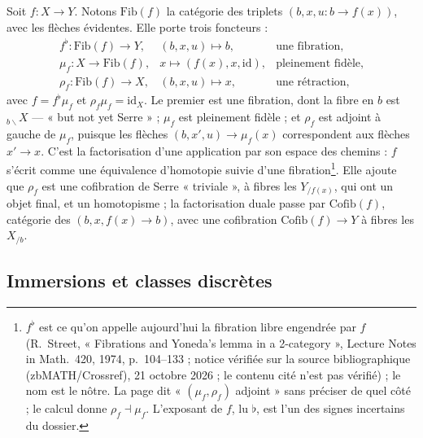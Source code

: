 \documentclass[11pt,a4paper]{article}
\begin{document}
Soit $f : X \to Y$. Notons $\mathrm{Fib}(f)$ la catégorie des triplets
$(b, x, u : b \to f(x))$, avec les flèches évidentes. Elle porte trois
foncteurs :
\[
\begin{array}{lll}
f^{\flat} : \mathrm{Fib}(f) \to Y, & (b, x, u) \mapsto b, & \text{une fibration,} \\
\mu_{f} : X \to \mathrm{Fib}(f), & x \mapsto (f(x), x, \mathrm{id}), & \text{pleinement fidèle,} \\
\rho_{f} : \mathrm{Fib}(f) \to X, & (b, x, u) \mapsto x, & \text{une rétraction,}
\end{array}
\]
avec $f = f^{\flat}\mu_{f}$ et $\rho_{f}\mu_{f} = \mathrm{id}_{X}$. Le premier
est une fibration, dont la fibre en $b$ est ${}_{b\backslash}X$ --- « but not
yet Serre » ; $\mu_{f}$ est pleinement fidèle ; et $\rho_{f}$ est adjoint à
gauche de $\mu_{f}$, puisque les flèches $(b, x', u) \to \mu_{f}(x)$
correspondent aux flèches $x' \to x$. C'est la factorisation d'une application
par son espace des chemins : $f$ s'écrit comme une équivalence d'homotopie
suivie d'une fibration\footnote{$f^{\flat}$ est ce qu'on appelle aujourd'hui
la fibration libre engendrée par $f$ (R.~Street, « Fibrations and Yoneda's lemma in a 2-category », Lecture Notes in Math.\ 420, 1974, p.~104--133 ; notice vérifiée sur la source bibliographique (zbMATH/Crossref), 21 octobre 2026 ; le contenu cité n'est pas vérifié) ; le nom est le nôtre. La
page dit « $(\mu_{f}, \rho_{f})$ adjoint » sans préciser de quel côté ; le
calcul donne $\rho_{f} \dashv \mu_{f}$. L'exposant de $f$, lu $\flat$, est
l'un des signes incertains du dossier.}. Elle ajoute que $\rho_{f}$ est une
cofibration de Serre « triviale », à fibres les $Y_{/f(x)}$, qui ont un objet
final, et un homotopisme ; la factorisation duale passe par
$\mathrm{Cofib}(f)$, catégorie des $(b, x, f(x) \to b)$, avec une cofibration
$\mathrm{Cofib}(f) \to Y$ à fibres les $X_{/b}$.

\subsection*{Immersions et classes discrètes}
\end{document}
